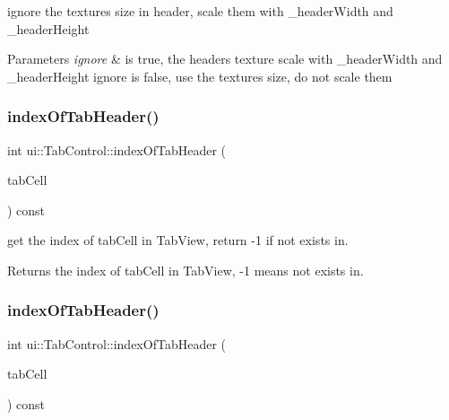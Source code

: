 ignore the textures\textquotesingle{} size in header, scale them with \+\_\+header\+Width and \+\_\+header\+Height 
\begin{DoxyParams}{Parameters}
{\em ignore} & is {\ttfamily true}, the header\textquotesingle{}s texture scale with \+\_\+header\+Width and \+\_\+header\+Height ignore is {\ttfamily false}, use the texture\textquotesingle{}s size, do not scale them \\
\hline
\end{DoxyParams}
\mbox{\label{classui_1_1TabControl_a4783116cb27769670ed4c4eff9c0985b}} 
\subsubsection{\texorpdfstring{index\+Of\+Tab\+Header()}{indexOfTabHeader()}\hspace{0.1cm}{\footnotesize\ttfamily [1/2]}}
{\footnotesize\ttfamily int ui\+::\+Tab\+Control\+::index\+Of\+Tab\+Header (\begin{DoxyParamCaption}\item[{const \hyperlink{classui_1_1TabHeader}{Tab\+Header} $\ast$}]{tab\+Cell }\end{DoxyParamCaption}) const}

get the index of tab\+Cell in Tab\+View, return -\/1 if not exists in. \begin{DoxyReturn}{Returns}
the index of tab\+Cell in Tab\+View, {\ttfamily -\/1} means not exists in. 
\end{DoxyReturn}
\mbox{\label{classui_1_1TabControl_a4783116cb27769670ed4c4eff9c0985b}} 
\subsubsection{\texorpdfstring{index\+Of\+Tab\+Header()}{indexOfTabHeader()}\hspace{0.1cm}{\footnotesize\ttfamily [2/2]}}
{\footnotesize\ttfamily int ui\+::\+Tab\+Control\+::index\+Of\+Tab\+Header (\begin{DoxyParamCaption}\item[{const \hyperlink{classui_1_1TabHeader}{Tab\+Header} $\ast$}]{tab\+Cell }\end{DoxyParamCaption}) const}

